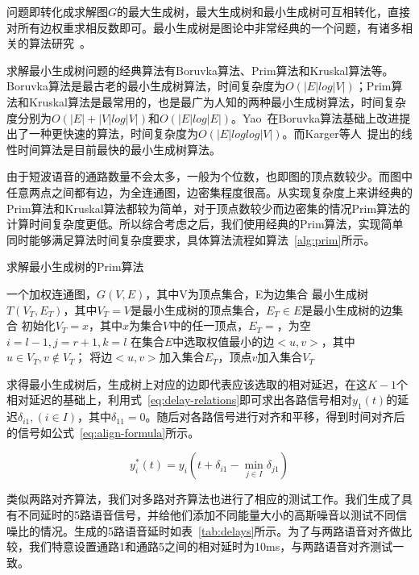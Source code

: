 问题即转化成求解图$G$的最大生成树，最大生成树和最小生成树可互相转化，直接对所有边权重求相反数即可。最小生成树是图论中非常经典的一个问题，有诸多相关的算法研究~\cite{bazlamaccci2001minimum}。

求解最小生成树问题的经典算法有Boruvka算法、Prim算法和Kruskal算法等。Boruvka算法是最古老的最小生成树算法，时间复杂度为$O(|E|log|V|)$；Prim算法和Kruskal算法是最常用的，也是最广为人知的两种最小生成树算法，时间复杂度分别为$O(|E|+|V|log|V|)$和$O(|E|log|E|)$。Yao~\cite{yao19750}在Boruvka算法基础上改进提出了一种更快速的算法，时间复杂度为$O(|E|loglog|V|)$。而Karger等人~\cite{karger1995randomized}提出的线性时间算法是目前最快的最小生成树算法。

由于短波语音的通路数量不会太多，一般为个位数，也即图的顶点数较少。而图中任意两点之间都有边，为全连通图，边密集程度很高。从实现复杂度上来讲经典的Prim算法和Kruskal算法都较为简单，对于顶点数较少而边密集的情况Prim算法的计算时间复杂度更低。所以综合考虑之后，我们使用经典的Prim算法，实现简单同时能够满足算法时间复杂度要求，具体算法流程如算法~\ref{alg:prim}所示。

\begin{algorithm}
    \caption{求解最小生成树的Prim算法}
    \label{alg:prim}
\begin{algorithmic}[1]
\INPUT
    \Statex 一个加权连通图，$G(V, E)$，其中V为顶点集合，E为边集合
\OUTPUT
    \Statex 最小生成树$T(V_T, E_T)$，其中$V_T = V$是最小生成树的顶点集合，$E_T \in E$是最小生成树的边集合
\State 初始化$V_T = {x}$，其中$x$为集合$V$中的任一顶点，$E_T = {}$，为空
\State $i=l-1, j=r+1, k=l$
    \State 在集合$E$中选取权值最小的边$<u, v>$，其中$u \in V_T, v \not\in V_T$；
    \State 将边$<u, v>$加入集合$E_T$，顶点$v$加入集合$V_T$
\EndWhile
\end{algorithmic}
\end{algorithm}

求得最小生成树后，生成树上对应的边即代表应该选取的相对延迟，在这$K-1$个相对延迟的基础上，利用式~\ref{eq:delay-relations}即可求出各路信号相对$y_1 (t)$的延迟$\delta_{i1},(i \in I)$，其中$\delta_{11}=0$。随后对各路信号进行对齐和平移，得到时间对齐后的信号如公式~\ref{eq:align-formula}所示。

\begin{equation}\label{eq:align-formula}
y_i^* (t)=y_i (t+\delta_{i1}-\min_{j\in I}\delta_{j1})
\end{equation}

类似两路对齐算法，我们对多路对齐算法也进行了相应的测试工作。我们生成了具有不同延时的5路语音信号，并给他们添加不同能量大小的高斯噪音以测试不同信噪比的情况。生成的5路语音延时如表~\ref{tab:delays}所示。为了与两路语音对齐做比较，我们特意设置通路1和通路5之间的相对延时为10ms，与两路语音对齐测试一致。

